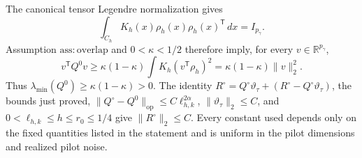 The canonical tensor Legendre normalization gives
\[
 \int_{C_h}K_h(x)\rho_h(x)\rho_h(x)^{\mathsf T}\,dx=I_{p_\gamma}.
\]
Assumption \(\mathrm{ass{:}overlap}\) and \(0<\kappa<1/2\) therefore imply, for every \(v\in\mathbb R^{p_\gamma}\),
\[
 v^{\mathsf T}Q^0v
 \ge\kappa(1-\kappa)\int K_h(v^{\mathsf T}\rho_h)^2
 =\kappa(1-\kappa)\lVert v\rVert_2^2.
\]
Thus \(\lambda_{\min}(Q^0)\ge\kappa(1-\kappa)>0\).  The identity \(R^\circ=Q^\circ\vartheta_\tau+(R^\circ-Q^\circ\vartheta_\tau)\), the bounds just proved, \(\lVert Q^\circ-Q^0\rVert_{\mathrm{op}}\le C\ell_{h,k}^{2\alpha}\), \(\lVert\vartheta_\tau\rVert_2\le C\), and \(0<\ell_{h,k}\le h\le r_0\le1/4\) give \(\lVert R^\circ\rVert_2\le C\).  Every constant used depends only on the fixed quantities listed in the statement and is uniform in the pilot dimensions and realized pilot noise.
